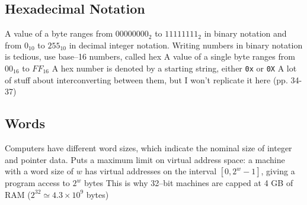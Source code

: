 \documentclass[../bryant_comp_sys.tex]{subfiles}
\begin{document}
            \subsection{Hexadecimal Notation}
                \begin{outline}
                    \1 A value of a byte ranges from \(00000000_2\) to \(11111111_2\) in binary notation and from \(0_{10}\) to \(255_{10}\) in decimal integer notation.
                    \1 Writing numbers in binary notation is tedious, use base--16 numbers, called \gls{hex}
                        \2 A value of a single byte ranges from \(00_{16}\) to \(FF_{16}\)
                        \2 A hex number is denoted by a starting string, either \texttt{0x} or \texttt{0X}
                    \1 A lot of stuff about interconverting between them, but I won't replicate it here (pp. 34-37)
                \end{outline}

            \subsection{Words}
                \begin{outline}
                    \1 Computers have different word sizes, which indicate the nominal size of integer and pointer data.
                    \1 Puts a maximum limit on virtual address space: a machine with a word size of \(w\) has virtual addresses on the interval \(\left[ 0, 2^w - 1 \right]\), giving a program access to \(2^w\) bytes
                        \2 This is why 32--bit machines are capped at 4 GB of RAM (\(2^{32} \simeq 4.3 \times 10^{9}\) bytes)
                \end{outline}
\end{document}
